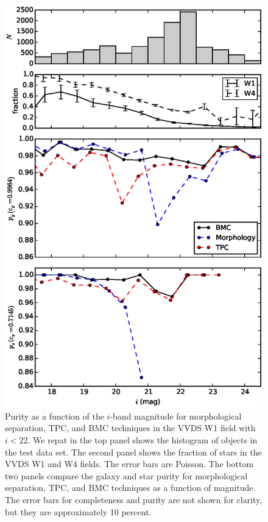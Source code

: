 \documentclass[useAMS,usenatbib]{mn2e}
\begin{document}
\begin{figure}
  \centering
  \includegraphics[width=\linewidth]{figures/purity_mag_cut.eps}
  \caption{Purity as a function of the $i$-band magnitude
           for morphological separation, TPC, and BMC techniques
           in the VVDS W1 field with $i < 22$.
           We repat in the top panel shows the histogram of objects
           in the test data set.
           The second panel shows the fraction of stars
           in the VVDS W1 and W4 fields.
           The error bars are Poisson.
           The bottom two panels compare
           the galaxy and star purity for morphological separation, TPC,
           and BMC techniques as a function of magnitude.
           The error bars for completeness and purity are not shown for
           clarity, but they are approximately 10 percent.}
  \label{fig:purity_mag_cut}
\end{figure}
\end{document}
